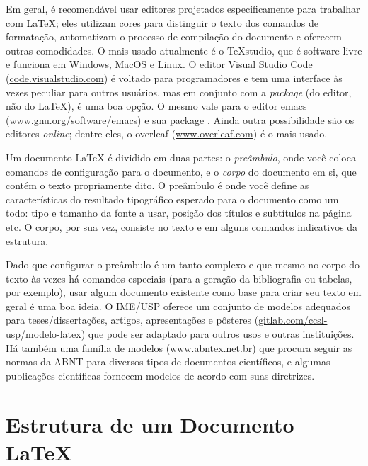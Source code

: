 Em geral, é recomendável usar editores projetados especificamente para
trabalhar com \LaTeX{}; eles utilizam cores para distinguir o texto dos
comandos de formatação, automatizam o processo de compilação do documento
e oferecem outras comodidades. O mais usado atualmente é o \TeX{}studio,
que é software livre e funciona em Windows, MacOS e Linux. O editor Visual
Studio Code (\url{code.visualstudio.com}) é voltado para programadores e
tem uma interface às vezes peculiar para outros usuários, mas em conjunto
com a \emph{package}  (do editor, não do \LaTeX), é uma
boa opção. O mesmo vale para o editor emacs (\url{www.gnu.org/software/emacs})
e sua package . Ainda outra possibilidade são os editores
\emph{online}; dentre eles, o overleaf (\url{www.overleaf.com}) é o mais usado.

Um documento \LaTeX{} é dividido em duas partes: o \emph{preâmbulo}, onde
você coloca comandos de configuração para o documento, e o \emph{corpo}
do documento em si, que contém o texto propriamente dito. O preâmbulo é
onde você define as características do resultado tipográfico esperado
para o documento como um todo: tipo e tamanho da fonte a usar, posição
dos títulos e subtítulos na página etc. O corpo, por sua vez, consiste no
texto e em alguns comandos indicativos da estrutura.

Dado que configurar o preâmbulo é um tanto complexo e que mesmo no corpo
do texto às vezes há comandos especiais (para a geração da bibliografia
ou tabelas, por exemplo),
usar algum documento existente como base para criar seu texto em geral é
uma boa ideia. O IME/USP oferece um conjunto de modelos adequados para
teses/dissertações, artigos, apresentações e pôsteres (\url{gitlab.com/ccsl-usp/modelo-latex})
que pode ser adaptado para outros usos e outras instituições. Há também uma
família de modelos (\url{www.abntex.net.br}) que procura seguir as normas
da ABNT para diversos tipos de documentos científicos, e algumas publicações
científicas fornecem modelos de acordo com suas diretrizes.

\section{Estrutura de um Documento \LaTeX{}}
\label{sec:basico}

